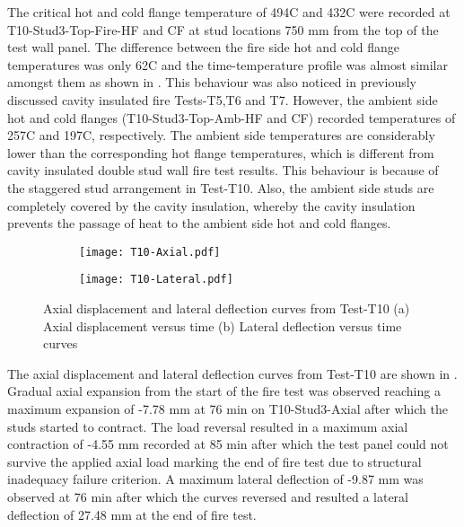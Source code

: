 The critical hot and cold flange temperature of 494\degree C and 432\degree C were recorded at T10-Stud3-Top-Fire-HF and CF at stud locations 750 mm from the top of the test wall panel. The difference between the fire side hot and cold flange temperatures was only 62\degree C and the time-temperature profile was almost similar amongst them as shown in . This behaviour was also noticed in previously discussed cavity insulated fire Tests-T5,T6 and T7. However, the ambient side hot and cold flanges (T10-Stud3-Top-Amb-HF and CF) recorded temperatures of 257\degree C and 197\degree C, respectively. The ambient side temperatures are considerably lower than the corresponding hot flange temperatures, which is different from cavity insulated double stud wall fire test results. This behaviour is because of the staggered stud arrangement in Test-T10. Also, the ambient side studs are completely covered by the cavity insulation, whereby the cavity insulation prevents the passage of heat to the ambient side hot and cold flanges.   
\begin{figure}[!htbp]
	\centering
	\begin{subfigure}[b]{0.7\textwidth}
		\centering
		\texttt{[image: T10-Axial.pdf]}
		\caption{}
		\label{subfig:T10-Axial}
	\end{subfigure}
	\begin{subfigure}[b]{0.7\textwidth}
		\centering
		\texttt{[image: T10-Lateral.pdf]}
		\caption{}
		\label{subfig:T10-Lateral}
	\end{subfigure}
	   \caption{Axial displacement and lateral deflection curves from Test-T10 (a) Axial displacement versus time (b) Lateral deflection versus time curves}
	   \label{fig:T10-displacement}
\end{figure}

The axial displacement and lateral deflection curves from Test-T10 are shown in . Gradual axial expansion from the start of the fire test was observed reaching a maximum expansion of -7.78 mm at 76 min on T10-Stud3-Axial after which the studs started to contract. The load reversal resulted in a maximum axial contraction of -4.55 mm recorded at 85 min after which the test panel could not survive the applied axial load marking the end of fire test due to structural inadequacy failure criterion. A maximum lateral deflection of -9.87 mm was observed at 76 min after which the curves reversed and resulted a lateral deflection of 27.48 mm at the end of fire test.

